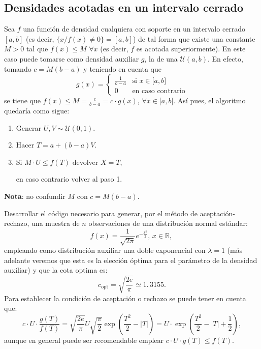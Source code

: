 \documentclass[]{book}
\theoremstyle{definition}
\theoremstyle{definition}
\theoremstyle{definition}
\theoremstyle{remark}
\let\BeginKnitrBlock\begin \let\EndKnitrBlock\end
\begin{document}
\subsection{Densidades acotadas en un intervalo
cerrado}\label{densidades-acotadas-en-un-intervalo-cerrado}

Sea \(f\) una función de densidad cualquiera con soporte en un intervalo
cerrado \([a,b]\) (es decir, \(\{x/f\left( x\right) \neq0\}=[a,b]\)) de
tal forma que existe una constante \(M>0\) tal que
\(f\left( x\right) \leq M\) \(\forall x\) (es decir, \(f\) es acotada
superiormente). En este caso puede tomarse como densidad auxiliar \(g\),
la de una \(\mathcal{U}(a,b)\). En efecto, tomando
\(c=M\left( b-a\right)\) y teniendo en cuenta que
\[g\left( x\right)  =\left\{
\begin{array}{ll}\frac{1}{b-a} & \text{si } x\in\lbrack a,b]\\
0 & \text{en caso contrario}
\end{array} \right.\] se tiene que
\(f\left( x\right) \leq M = \frac{c}{b-a}=c\cdot g\left( x\right)\),
\(\forall x\in\lbrack a,b]\). Así pues, el algoritmo quedaría como
sigue:

\begin{enumerate}
\def\labelenumi{\arabic{enumi}.}
\item
  Generar \(U,V\sim \mathcal{U}\left( 0, 1\right)\).
\item
  Hacer \(T = a + \left( b-a \right) V\).
\item
  Si \(M \cdot U\leq f\left( T \right)\) devolver \(X = T\),

  en caso contrario volver al paso 1.
\end{enumerate}

\textbf{Nota}: no confundir \(M\) con \(c = M \left( b - a \right)\).

\BeginKnitrBlock{exercise}
\protect\hypertarget{exr:unnamed-chunk-8}{}{\label{exr:unnamed-chunk-8} }
\EndKnitrBlock{exercise}

Desarrollar el código necesario para generar, por el método de
aceptación-rechazo, una muestra de \(n\) observaciones de una
distribución normal estándar:
\[f\left( x\right)  =\frac{1}{\sqrt{2\pi}}e^{-\frac{x^{2}}{2}}\text{, }x\in\mathbb{R}\text{, }\]
empleando como distribución auxiliar una doble exponencial con
\(\lambda=1\) (más adelante veremos que esta es la elección óptima para
el parámetro de la densidad auxiliar) y que la cota optima
es:\[c_{\text{opt}}=\sqrt{\frac{2e}{\pi}}\simeq1.\,3155.\] Para
establecer la condición de aceptación o rechazo se puede tener en cuenta
que:
\[c\cdot U\cdot\frac{g\left( T\right)  }{f\left( T\right)  }=\sqrt{\frac
{2e}{\pi}}U\sqrt{\frac{\pi}{2}}\exp\left( \frac{T^{2}}{2}-\left\vert
T\right\vert \right)  =U\cdot\exp\left( \frac{T^{2}}{2}-\left\vert
T\right\vert +\frac{1}{2}\right)  ,\] aunque en general puede ser
recomendable emplear
\(c\cdot U\cdot g\left( T\right) \leq f\left( T\right)\).
\end{document}
